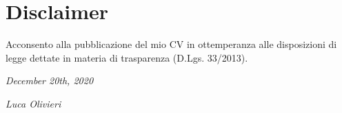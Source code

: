 \documentclass[]{friggeri-cv}
\begin{document}
\section{Disclaimer}
Acconsento alla pubblicazione del mio CV in ottemperanza alle disposizioni di legge dettate in materia di trasparenza (D.Lgs. 33/2013).

\begin{flushleft}
\emph{December 20th, 2020}
\end{flushleft}
\begin{flushright}
\emph{Luca Olivieri}
\end{flushright}

% 
\end{document}
